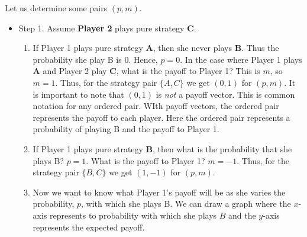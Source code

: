  Let us determine some pairs $(p, m)$.
\begin{itemize}
\item Step 1. Assume {\bf Player 2} plays pure strategy {\bf C}.
\begin{enumerate}
\item If Player 1 plays pure strategy {\bf A}, then she never plays {\bf B}. Thus the probability she play B is 0. Hence,  $p=0$. In the case where Player 1 plays {\bf A} and Player 2 play {\bf C}, what is the payoff to Player 1? This is $m$, so $m=1$. Thus, for the strategy pair $\{A, C\}$ we get $(0, 1)$ for $(p, m)$. It is important to note that $(0, 1)$ is {\it not} a payoff vector. This is common notation for any ordered pair. WIth payoff vectors, the ordered pair represents the payoff to each player. Here the ordered pair represents a probability of playing B and the payoff to Player 1.
\item If Player 1 plays pure strategy {\bf B}, then what is the probability that she plays B? $p=1$. What is the payoff to Player 1? $m=-1$. Thus, for the strategy pair $\{B, C\}$ we get $(1, -1)$ for $(p, m)$.
\item Now we want to know what Player 1's payoff will be as she varies the probability, $p$, with which she plays B. We can draw a graph where the $x$-axis represents to probability with which she plays $B$ and the $y$-axis represents the expected payoff.


\begin{figure}
\begin{center}
\end{center}
\end{figure}
\end{enumerate}
\end{itemize}
